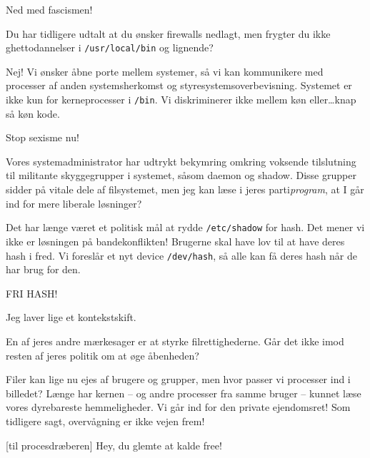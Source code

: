 \documentclass[a4paper,11pt]{article}
\begin{document}
\begin{sketch}
 Ned med fascismen!

 Du har tidligere udtalt at du ønsker firewalls nedlagt, men frygter du
ikke ghettodannelser i \texttt{/usr/local/bin} og lignende?


 Nej! Vi ønsker åbne porte mellem systemer, så vi kan kommunikere med
processer af anden systemsherkomst og styresystemsoverbevisning. Systemet er
ikke kun for kerneprocesser i \texttt{/bin}. Vi diskriminerer ikke mellem køn
eller\ldots knap så køn kode.

 Stop sexisme nu!

 Vores systemadministrator har udtrykt bekymring omkring voksende
tilslutning til militante skyggegrupper i systemet, såsom daemon og shadow.
Disse grupper sidder på vitale dele af filsystemet, men jeg kan læse i jeres
parti\emph{program}, at I går ind for mere liberale løsninger?

 Det har længe været et politisk mål at rydde \texttt{/etc/shadow} for
hash. Det mener vi ikke er løsningen på bandekonflikten! Brugerne skal have lov
til at have deres hash i fred. Vi foreslår et nyt device \texttt{/dev/hash}, så
alle kan få deres hash når de har brug for den.

 FRI HASH!

 Jeg laver lige et kontekstskift.


 En af jeres andre mærkesager er at styrke filrettighederne. Går det
ikke imod resten af jeres politik om at øge åbenheden?



 Filer kan lige nu ejes af brugere og grupper, men hvor passer vi
processer ind i billedet? Længe har kernen -- og andre processer fra samme
bruger -- kunnet læse vores dyrebareste hemmeligheder. Vi går ind for den
private ejendomsret! Som tidligere sagt, overvågning er ikke vejen frem!


[til procesdræberen] Hey, du glemte at kalde free! 



\end{sketch}
\end{document}
